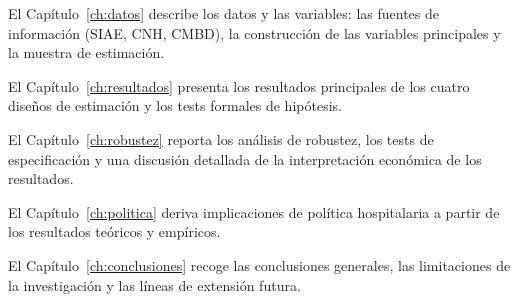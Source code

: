 El Capítulo~\ref{ch:datos} describe los datos y las variables: las fuentes de información (SIAE, CNH, CMBD), la construcción de las variables principales y la muestra de estimación.

El Capítulo~\ref{ch:resultados} presenta los resultados principales de los cuatro diseños de estimación y los tests formales de hipótesis.

El Capítulo~\ref{ch:robustez} reporta los análisis de robustez, los tests de especificación y una discusión detallada de la interpretación económica de los resultados.

El Capítulo~\ref{ch:politica} deriva implicaciones de política hospitalaria a partir de los resultados teóricos y empíricos.

El Capítulo~\ref{ch:conclusiones} recoge las conclusiones generales, las limitaciones de la investigación y las líneas de extensión futura.
